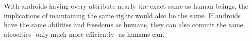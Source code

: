 With androids having every attribute nearly the exact same as human beings, the implications of maintaining the same rights would also be the same. If androids have the same abilities and freedoms as humans, they can also commit the same atrocities -only much more efficiently- as humans can.